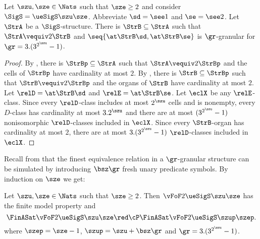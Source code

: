 

\begin{remark}\label{rem:twovar-granular}
Let $\szu, \sze \in \Nats$ such that $\sze \geq 2$ and consider
$\SigS = \ueSigS\szu\sze$.
Abbreviate $\sd = \see1$ and $\se = \see2$.
Let $\StrA$ be a $\SigS$-structure.
There is $\StrB \subseteq \StrA$ such that
$\StrA \vequiv2 \StrB$ and $\seq{\at\StrB\sd,\at\StrB\se}$ is $\gr$-granular
for $\gr = 3.(3^{2^\szu}-1)$.
\end{remark}
\begin{proof}
By , there is $\StrBp \subseteq \StrA$ such that
$\StrA \vequiv2 \StrBp$ and the cells of $\StrBp$ have cardinality at most $2$.
By , there is $\StrB \subseteq \StrBp$ such that
$\StrB \vequiv2 \StrBp$ and the organs of $\StrB$ have cardinality at most $2$.
Let $\relD = \at\StrB\sd$ and $\relE = \at\StrB\se$.
Let $\eclX$ be any $\relE$-class.
Since every $\relD$-class includes at most $2^\szu$ cells and is nonempty, every
$D$-class has cardinality at most $3.2^\szu$ and there are at most
$(3^{2^\szu}-1)$ nonisomorphic $\relD$-classes included in $\eclX$.
Since every $\StrB$-organ has cardinality at most $2$, there are at most
$3.(3^{2^\szu}-1)$ $\relD$-classes included in $\eclX$.
\end{proof}
Recall from  that the finest equivalence relation in a
$\gr$-granular structure can be simulated by introducing $\bsz\gr$ fresh unary
predicate symbols.
By induction on $\sze$ we get:
\begin{corollary}\label{cor:twovar-sub-1}
Let $\szu,\sze \in \Nats$ such that $\sze \geq 2$.
Then $\vFoF2{\ueSigS\szu\sze}$ has the finite model property and
\[
  \FinASat\vFoF2{\ueSigS\szu\sze} \red\cP
  \FinASat\vFoF2{\ueSigS\szup\szep}.
\]
where $\szep = \sze - 1$, $\szup = \szu + \bsz\gr$ and
$\gr = 3.(3^{2^\szu} - 1)$.
\end{corollary}

